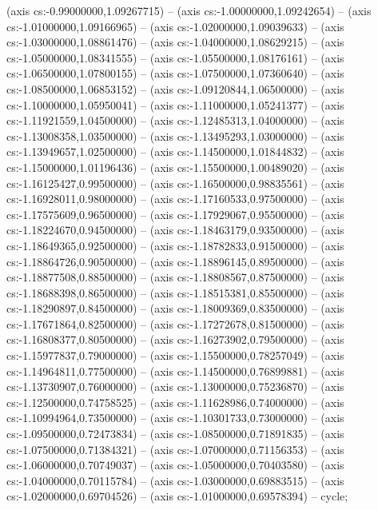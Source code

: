 (axis cs:-0.99000000,1.09267715) -- (axis cs:-1.00000000,1.09242654) -- (axis cs:-1.01000000,1.09166965) -- (axis cs:-1.02000000,1.09039633) -- (axis cs:-1.03000000,1.08861476) -- (axis cs:-1.04000000,1.08629215) -- (axis cs:-1.05000000,1.08341555) -- (axis cs:-1.05500000,1.08176161) -- (axis cs:-1.06500000,1.07800155) -- (axis cs:-1.07500000,1.07360640) -- (axis cs:-1.08500000,1.06853152) -- (axis cs:-1.09120844,1.06500000) -- (axis cs:-1.10000000,1.05950041) -- (axis cs:-1.11000000,1.05241377) -- (axis cs:-1.11921559,1.04500000) -- (axis cs:-1.12485313,1.04000000) -- (axis cs:-1.13008358,1.03500000) -- (axis cs:-1.13495293,1.03000000) -- (axis cs:-1.13949657,1.02500000) -- (axis cs:-1.14500000,1.01844832) -- (axis cs:-1.15000000,1.01196436) -- (axis cs:-1.15500000,1.00489020) -- (axis cs:-1.16125427,0.99500000) -- (axis cs:-1.16500000,0.98835561) -- (axis cs:-1.16928011,0.98000000) -- (axis cs:-1.17160533,0.97500000) -- (axis cs:-1.17575609,0.96500000) -- (axis cs:-1.17929067,0.95500000) -- (axis cs:-1.18224670,0.94500000) -- (axis cs:-1.18463179,0.93500000) -- (axis cs:-1.18649365,0.92500000) -- (axis cs:-1.18782833,0.91500000) -- (axis cs:-1.18864726,0.90500000) -- (axis cs:-1.18896145,0.89500000) -- (axis cs:-1.18877508,0.88500000) -- (axis cs:-1.18808567,0.87500000) -- (axis cs:-1.18688398,0.86500000) -- (axis cs:-1.18515381,0.85500000) -- (axis cs:-1.18290897,0.84500000) -- (axis cs:-1.18009369,0.83500000) -- (axis cs:-1.17671864,0.82500000) -- (axis cs:-1.17272678,0.81500000) -- (axis cs:-1.16808377,0.80500000) -- (axis cs:-1.16273902,0.79500000) -- (axis cs:-1.15977837,0.79000000) -- (axis cs:-1.15500000,0.78257049) -- (axis cs:-1.14964811,0.77500000) -- (axis cs:-1.14500000,0.76899881) -- (axis cs:-1.13730907,0.76000000) -- (axis cs:-1.13000000,0.75236870) -- (axis cs:-1.12500000,0.74758525) -- (axis cs:-1.11628986,0.74000000) -- (axis cs:-1.10994964,0.73500000) -- (axis cs:-1.10301733,0.73000000) -- (axis cs:-1.09500000,0.72473834) -- (axis cs:-1.08500000,0.71891835) -- (axis cs:-1.07500000,0.71384321) -- (axis cs:-1.07000000,0.71156353) -- (axis cs:-1.06000000,0.70749037) -- (axis cs:-1.05000000,0.70403580) -- (axis cs:-1.04000000,0.70115784) -- (axis cs:-1.03000000,0.69883515) -- (axis cs:-1.02000000,0.69704526) -- (axis cs:-1.01000000,0.69578394) -- cycle;
